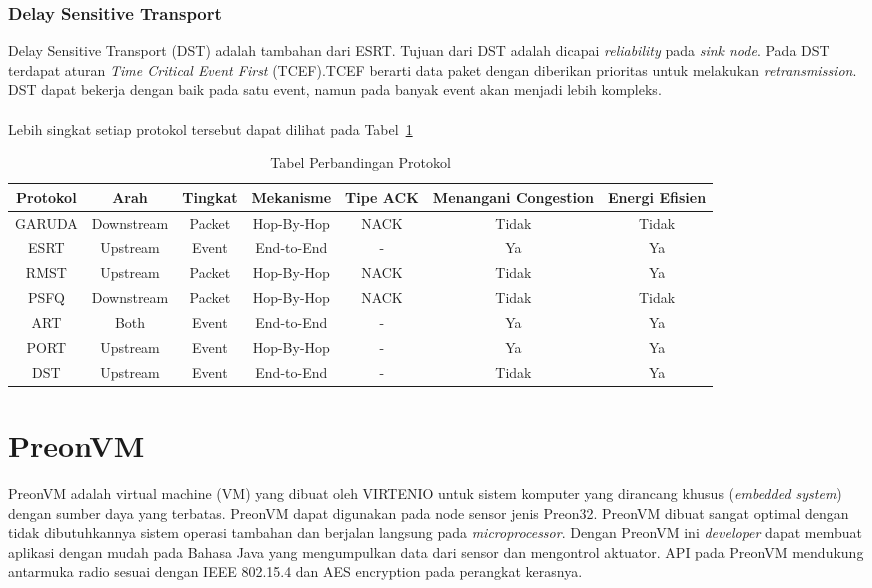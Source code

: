 \subsubsection{Delay Sensitive Transport}
Delay Sensitive Transport (DST) adalah tambahan dari ESRT. Tujuan dari DST adalah dicapai \textit{reliability} pada \textit{sink node}. Pada DST terdapat aturan \textit{Time Critical Event First} (TCEF).TCEF berarti data paket dengan diberikan prioritas untuk melakukan \textit{retransmission}. DST dapat bekerja dengan baik pada satu event, namun pada banyak event akan menjadi lebih kompleks.
\\
\\
Lebih singkat setiap protokol tersebut dapat dilihat pada Tabel~\ref{tab:protokol_reliable}
\begin{table}[H] %
	\centering 
	\caption{Tabel Perbandingan Protokol}
	\label{tab:protokol_reliable}
	\begin{tabular}{|c|c|c|c|c|c|c|}
		\toprule
		Protokol & Arah & Tingkat & Mekanisme & Tipe ACK & Menangani Congestion & Energi Efisien \\

		\midrule
		GARUDA & Downstream & Packet & Hop-By-Hop & NACK & Tidak & Tidak\\
		ESRT & Upstream & Event & End-to-End & - & Ya & Ya\\
		RMST & Upstream & Packet & Hop-By-Hop & NACK & Tidak & Ya\\
		PSFQ & Downstream & Packet & Hop-By-Hop & NACK & Tidak & Tidak\\
		ART & Both & Event & End-to-End	 & - & Ya & Ya\\
		PORT & Upstream & Event & Hop-By-Hop & - & Ya & Ya\\
		DST & Upstream & Event & End-to-End & - & Tidak & Ya\\

		\bottomrule
		
	\end{tabular} 
\end{table}

\section{PreonVM}
\label{sec:PreonVM}
PreonVM adalah virtual machine (VM) yang dibuat oleh VIRTENIO untuk sistem komputer yang dirancang khusus (\textit{embedded system}) dengan sumber daya yang terbatas. PreonVM dapat digunakan pada node sensor jenis Preon32. PreonVM dibuat sangat optimal dengan tidak dibutuhkannya sistem operasi tambahan dan berjalan langsung pada \textit{microprocessor}. Dengan PreonVM ini \textit{developer} dapat membuat aplikasi dengan mudah pada Bahasa Java yang mengumpulkan data dari sensor dan mengontrol aktuator. API pada PreonVM mendukung antarmuka radio sesuai dengan IEEE 802.15.4 dan AES encryption pada perangkat kerasnya. 

